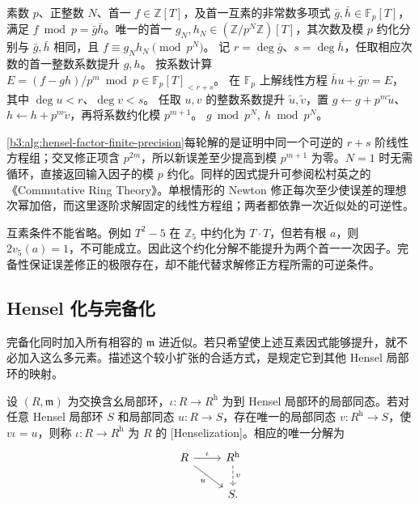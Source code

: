 \begin{algorithm}[htbp]
	\caption{Hensel 互素因式有限精度提升}
	\label{b3:alg:hensel-factor-finite-precision}
	\begin{algorithmsteps}{素数 \(p\)、正整数 \(N\)、首一 \(f\in\mathbb Z[T]\)，及首一互素的非常数多项式 \(\bar g,\bar h\in\mathbb F_p[T]\)，满足 \(f\bmod p=\bar g\bar h\)。}{唯一的首一 \(g_N,h_N\in(\mathbb Z/p^N\mathbb Z)[T]\)，其次数及模 \(p\) 约化分别与 \(\bar g,\bar h\) 相同，且 \(f\equiv g_Nh_N\pmod{p^N}\)。}
		\State 记 \(r=\deg\bar g\)、\(s=\deg\bar h\)，任取相应次数的首一整数系数提升 \(g,h\)。
			\State 按系数计算 \(E=(f-gh)/p^m\bmod p\in\mathbb F_p[T]_{<r+s}\)。
			\State 在 \(\mathbb F_p\) 上解线性方程 \(\bar h u+\bar g v=E\)，其中 \(\deg u<r\)、\(\deg v<s\)。
			\State 任取 \(u,v\) 的整数系数提升 \(\tilde u,\tilde v\)，置 \(g\gets g+p^m\tilde u\)、\(h\gets h+p^m\tilde v\)，再将系数约化模 \(p^{m+1}\)。
		\EndFor
		\State \Return \(g\bmod p^N,\ h\bmod p^N\)。
	\end{algorithmsteps}
\end{algorithm}

\cref{b3:alg:hensel-factor-finite-precision}每轮解的是证明中同一个可逆的 \(r+s\) 阶线性方程组；交叉修正项含 \(p^{2m}\)，所以新误差至少提高到模 \(p^{m+1}\) 为零。\(N=1\) 时无需循环，直接返回输入因子的模 \(p\) 约化。同样的因式提升可参阅松村英之的《Commutative Ring Theory》\cite[Theorem 8.3, p. 58]{Matsumura1989CommutativeRingTheory}。单根情形的 Newton 修正每次至少使误差的理想次幂加倍，而这里逐阶求解固定的线性方程组；两者都依靠一次近似处的可逆性。

\ProseParagraphBreak
互素条件不能省略。例如 \(T^2-5\) 在 \(\mathbb Z_5\) 中约化为 \(T\cdot T\)，但若有根 \(a\)，则 \(2v_5(a)=1\)，不可能成立。因此这个约化分解不能提升为两个首一一次因子。完备性保证误差修正的极限存在，却不能代替求解修正方程所需的可逆条件。

\subsection{Hensel 化与完备化}
\label{b3:subsec:2301:03}

完备化同时加入所有相容的 \(\mathfrak m\) 进近似。若只希望使上述互素因式能够提升，就不必加入这么多元素。描述这个较小扩张的合适方式，是规定它到其他 Hensel 局部环的映射。

\begin{definition}\label{b3:def:henselization}
	设 \((R,\mathfrak m)\) 为交换含幺局部环，\(\iota:R\to R^{\mathrm h}\) 为到 Hensel 局部环的局部同态。若对任意 Hensel 局部环 \(S\) 和局部同态 \(u:R\to S\)，存在唯一的局部同态 \(v:R^{\mathrm h}\to S\)，使 \(v\iota=u\)，则称 \(\iota:R\to R^{\mathrm h}\) 为 \(R\) 的 [Henselization]。相应的唯一分解为
	\[
		\begin{tikzcd}
			R \arrow[r,"\iota"] \arrow[dr,"u"'] & R^{\mathrm h} \arrow[d,dashed,"v"] \\
			& S .
		\end{tikzcd}
	\]
\end{definition}

